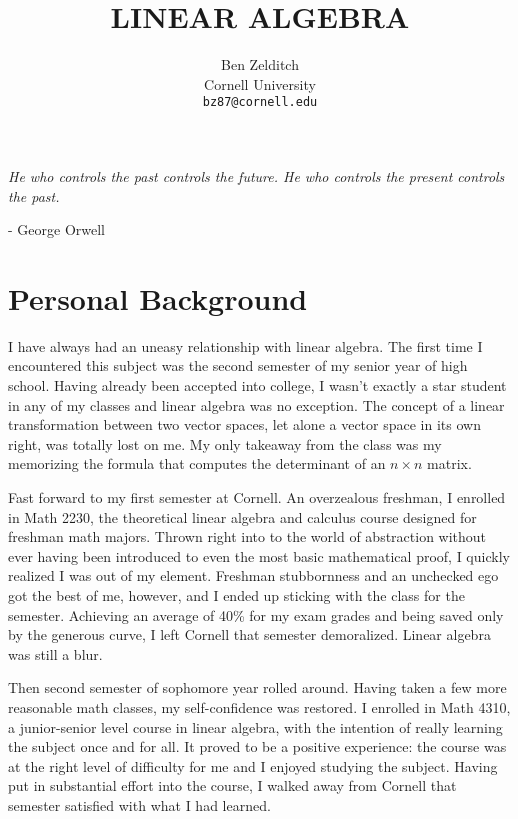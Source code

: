 \documentclass[paper=a4, fontsize=11pt,twoside]{scrartcl}   %
\title{  
            \LARGE \textbf{\uppercase{Linear Algebra}}    %
}
\author{
        Ben Zelditch\\   
        Cornell University\\  
        \texttt{bz87@cornell.edu} \\
}
\makeatletter
\def\printtitle{%
    {\centering \@title\par}}
\def\printauthor{%
    {\centering \large \@author}}
\makeatother
\begin{document}
\thispagestyle{empty}       %

\printtitle                 %
    \vfill
\printauthor                %
\newpage

 \textit{He who controls the past controls the future. He who controls the present controls the past.} 
 
 \vskip 1mm
		- George Orwell
\section{Personal Background}

I have always had an uneasy relationship with linear algebra. The first time I encountered this subject was
the second semester of my senior year of high school. Having already been accepted into college, I wasn't exactly
a star student in any of my classes and linear algebra was no exception. The concept of a linear transformation between two
vector spaces, let alone a vector space in its own right, was totally lost on me. My only takeaway from the class was my memorizing the formula that
computes the determinant of an $n \times n$ matrix. 

Fast forward
to my first semester at Cornell. An overzealous freshman, I enrolled in Math 2230, the theoretical linear algebra and calculus course designed
for freshman math majors. Thrown right into to the world of abstraction without ever having been introduced to even the most basic
mathematical proof, I quickly realized I was out of my element. Freshman stubbornness and an unchecked ego got the best of me, however,
and I ended up sticking with the class for the semester. Achieving an average of 40\% for my exam grades and being saved only by the generous
curve, I left Cornell that semester demoralized. Linear algebra was still a blur.

Then second semester of sophomore year rolled around. Having taken a few more reasonable math classes, my self-confidence was restored. I enrolled in Math 4310, 
a junior-senior level course in linear algebra, with the intention of really learning the subject once and for all. It proved to be a positive experience:  the course was at the right level
of difficulty for me and I enjoyed studying the subject. Having put in substantial effort into the course, I walked away from Cornell that semester satisfied with what I had learned.
\end{document}
